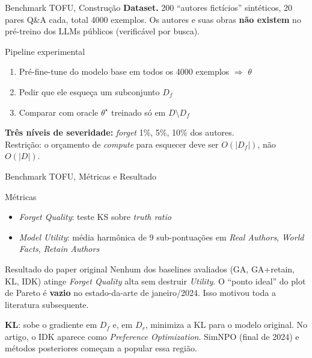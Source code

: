 \documentclass[aspectratio=169,xcolor=dvipsnames]{beamer}
\begin{document}
  \begin{frame}{Benchmark TOFU, Construção}
    \textbf{Dataset.} 200 ``autores fictícios'' sintéticos, 20 pares Q\&A cada, total 4000 exemplos. Os autores e suas obras \textbf{não existem} no pré-treino dos LLMs públicos (verificável por busca).

    \vspace{0.3em}
    \begin{block}{Pipeline experimental}
      \begin{enumerate}
        \item Pré-fine-tune do modelo base em todos os 4000 exemplos $\Rightarrow$ $\theta$
        \item Pedir que ele esqueça um subconjunto $D_f$
        \item Comparar com oracle $\theta^\star$ treinado só em $D \setminus D_f$
      \end{enumerate}
    \end{block}

    \vspace{0.3em}
    \textbf{Três níveis de severidade:} \textit{forget} 1\%, 5\%, 10\% dos autores.\\[0.2em]
    \footnotesize Restrição: o orçamento de \textit{compute} para esquecer deve ser $O(|D_f|)$, não $O(|D|)$.
  \end{frame}

  \begin{frame}{Benchmark TOFU, Métricas e Resultado}
    \begin{block}{Métricas}
      \begin{itemize}\setlength{\itemsep}{0pt}
        \item \textit{Forget Quality}: teste KS sobre \textit{truth ratio}
        \item \textit{Model Utility}: média harmônica de 9 sub-pontuações em \textit{Real Authors}, \textit{World Facts}, \textit{Retain Authors}
      \end{itemize}
    \end{block}

    \vspace{0.3em}
    \begin{alertblock}{Resultado do paper original}
      Nenhum dos baselines avaliados (GA, GA+retain, KL, IDK) atinge \textit{Forget Quality} alta sem destruir \textit{Utility}. O ``ponto ideal'' do plot de Pareto é \textbf{vazio} no estado-da-arte de janeiro/2024. Isso motivou toda a literatura subsequente.
    \end{alertblock}

    \vspace{0.3em}
    \footnotesize \textbf{KL}: sobe o gradiente em $D_f$ e, em $D_r$, minimiza a KL para o modelo original. No artigo, o IDK aparece como \textit{Preference Optimization}. SimNPO (final de 2024) e métodos posteriores começam a popular essa região.
  \end{frame}
\end{document}
